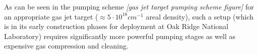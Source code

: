 As can be seen in the pumping scheme \emph{[gas jet target pumping scheme figure]} for an appropriate gas jet target ($\approx 5\cdot10^{18} \unit{cm^{-1}}$ areal density), such a setup (which is in its early construction phases for deployment at Oak Ridge National Laboratory) requires significantly more powerful pumping stages as well as expensive gas compression and cleaning.\\
 





